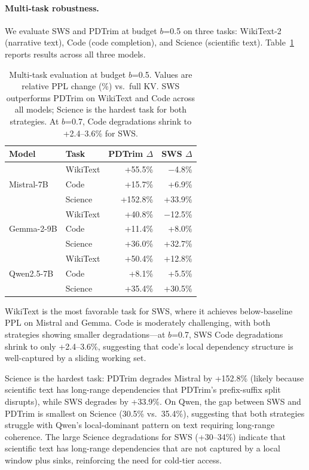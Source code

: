 \documentclass[11pt]{article}
\newcommand{\sws}{SWS}
\newcommand{\pct}{\%}
\theoremstyle{definition}
\theoremstyle{plain}
\begin{document}
\paragraph{Multi-task robustness.}  We evaluate \sws{} and PDTrim at budget $b$=0.5 on three tasks: WikiText-2 (narrative text), Code (code completion), and Science (scientific text).  Table~\ref{tab:multitask} reports results across all three models.

\begin{table}[t]
\centering
\caption{Multi-task evaluation at budget $b$=0.5.  Values are relative PPL change (\%) vs.\ full KV.  \sws{} outperforms PDTrim on WikiText and Code across all models; Science is the hardest task for both strategies.  At $b$=0.7, Code degradations shrink to +2.4--3.6\pct{} for \sws{}.}
\label{tab:multitask}
\small
\begin{tabular}{llrr}
\toprule
Model & Task & PDTrim $\Delta$ & \sws{} $\Delta$ \\
\midrule
\multirow{3}{*}{Mistral-7B} 
 & WikiText & +55.5\pct{} & $-$4.8\pct{} \\
 & Code & +15.7\pct{} & +6.9\pct{} \\
 & Science & +152.8\pct{} & +33.9\pct{} \\
\midrule
\multirow{3}{*}{Gemma-2-9B} 
 & WikiText & +40.8\pct{} & $-$12.5\pct{} \\
 & Code & +11.4\pct{} & +8.0\pct{} \\
 & Science & +36.0\pct{} & +32.7\pct{} \\
\midrule
\multirow{3}{*}{Qwen2.5-7B} 
 & WikiText & +50.4\pct{} & +12.8\pct{} \\
 & Code & +8.1\pct{} & +5.5\pct{} \\
 & Science & +35.4\pct{} & +30.5\pct{} \\
\bottomrule
\end{tabular}
\end{table}

WikiText is the most favorable task for \sws{}, where it achieves below-baseline PPL on Mistral and Gemma.  Code is moderately challenging, with both strategies showing smaller degradations---at $b$=0.7, \sws{} Code degradations shrink to only +2.4--3.6\pct{}, suggesting that code's local dependency structure is well-captured by a sliding working set.

Science is the hardest task: PDTrim degrades Mistral by +152.8\pct{} (likely because scientific text has long-range dependencies that PDTrim's prefix-suffix split disrupts), while \sws{} degrades by +33.9\pct{}.  On Qwen, the gap between \sws{} and PDTrim is smallest on Science (30.5\pct{} vs.\ 35.4\pct{}), suggesting that both strategies struggle with Qwen's local-dominant pattern on text requiring long-range coherence.  The large Science degradations for \sws{} (+30--34\pct{}) indicate that scientific text has long-range dependencies that are not captured by a local window plus sinks, reinforcing the need for cold-tier access.
\end{document}
